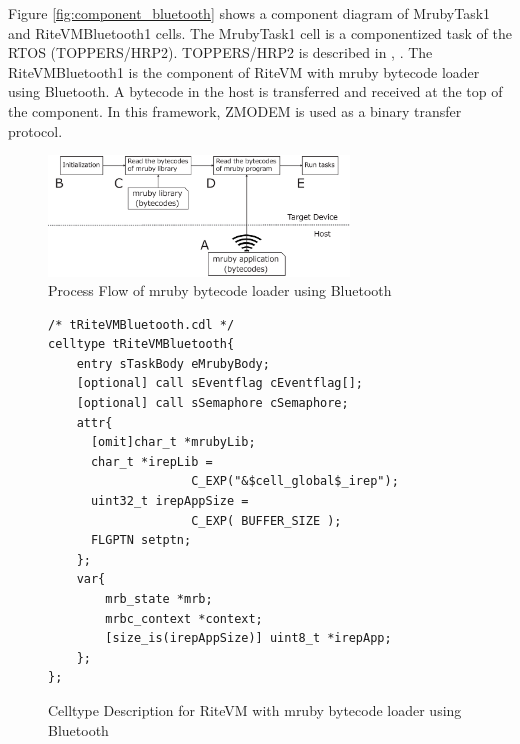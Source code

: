 \documentclass{sig-alternate-05-2015}
\begin{document}
Figure \ref{fig:component_bluetooth} shows a component diagram of MrubyTask1 and RiteVMBluetooth1 {\myit cell}s.
The MrubyTask1 {\myit cell} is a componentized task of the RTOS (TOPPERS/HRP2).
TOPPERS/HRP2 is described in \cite{url:HRP2}, \cite{par:hr-tecs}.
The RiteVMBluetooth1 is the component of RiteVM with mruby bytecode loader using Bluetooth.
A bytecode in the host is transferred and received at the top of the component.
In this framework, ZMODEM \cite{par:zmodem} is used as a binary transfer protocol.

\begin{figure}[t]
    \centering
    \includegraphics[width=8cm,clip]{figure/control_flow.eps}
    \caption{Process Flow of mruby bytecode loader using Bluetooth}
    \label{fig:control_flow}
\end{figure}

\begin{figure}[t]
\centering
\begin{lstlisting}
/* tRiteVMBluetooth.cdl */
celltype tRiteVMBluetooth{
    entry sTaskBody eMrubyBody;
    [optional] call sEventflag cEventflag[];
    [optional] call sSemaphore cSemaphore;
    attr{
      [omit]char_t *mrubyLib;
      char_t *irepLib = 
                    C_EXP("&$cell_global$_irep");
      uint32_t irepAppSize = 
                    C_EXP( BUFFER_SIZE );
      FLGPTN setptn;
    };
    var{
        mrb_state *mrb;
        mrbc_context *context;
        [size_is(irepAppSize)] uint8_t *irepApp;
    };
};
\end{lstlisting}
\caption{Celltype Description for RiteVM with mruby bytecode loader using Bluetooth}
\label{celltype_mrubybluetooth}
\end{figure}
\end{document}
